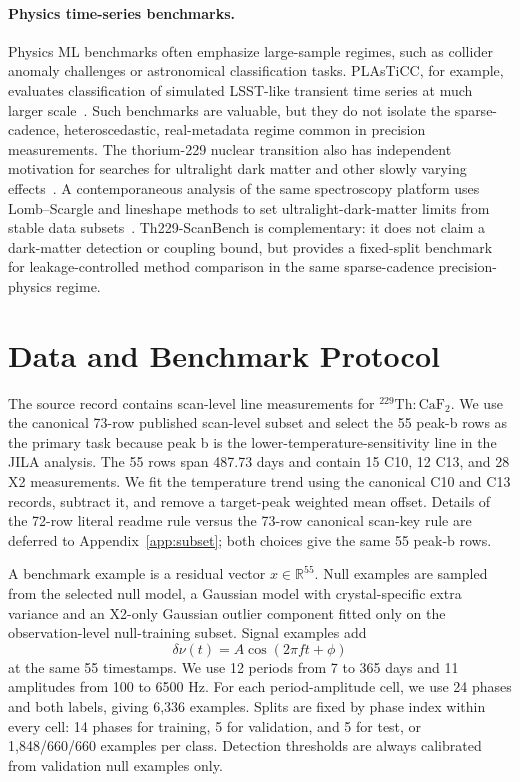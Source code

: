 \documentclass{article}
\newcommand{\thscan}{Th229-ScanBench}
\begin{document}
\paragraph{Physics time-series benchmarks.}
Physics ML benchmarks often emphasize large-sample regimes, such as collider anomaly challenges or astronomical classification tasks.  PLAsTiCC, for example, evaluates classification of simulated LSST-like transient time series at much larger scale~\citep{kessler2019plasticc}.  Such benchmarks are valuable, but they do not isolate the sparse-cadence, heteroscedastic, real-metadata regime common in precision measurements.  The thorium-229 nuclear transition also has independent motivation for searches for ultralight dark matter and other slowly varying effects~\citep{fuchs2025searching}.  A contemporaneous analysis of the same spectroscopy platform uses Lomb--Scargle and lineshape methods to set ultralight-dark-matter limits from stable data subsets~\citep{arakawa2026probing}.  \thscan{} is complementary: it does not claim a dark-matter detection or coupling bound, but provides a fixed-split benchmark for leakage-controlled method comparison in the same sparse-cadence precision-physics regime.

\section{Data and Benchmark Protocol}

The source record contains scan-level line measurements for \(^{229}\mathrm{Th}:\mathrm{CaF}_2\).  We use the canonical 73-row published scan-level subset and select the 55 peak-b rows as the primary task because peak b is the lower-temperature-sensitivity line in the JILA analysis.  The 55 rows span 487.73 days and contain 15 C10, 12 C13, and 28 X2 measurements.  We fit the temperature trend using the canonical C10 and C13 records, subtract it, and remove a target-peak weighted mean offset.  Details of the 72-row literal readme rule versus the 73-row canonical scan-key rule are deferred to Appendix~\ref{app:subset}; both choices give the same 55 peak-b rows.

A benchmark example is a residual vector \(x\in\mathbb{R}^{55}\).  Null examples are sampled from the selected null model, a Gaussian model with crystal-specific extra variance and an X2-only Gaussian outlier component fitted only on the observation-level null-training subset.  Signal examples add
\begin{equation}
  \delta\nu(t) = A\cos(2\pi f t + \phi)
\end{equation}
at the same 55 timestamps.  We use 12 periods from 7 to 365 days and 11 amplitudes from 100 to 6500 Hz.  For each period-amplitude cell, we use 24 phases and both labels, giving 6,336 examples.  Splits are fixed by phase index within every cell: 14 phases for training, 5 for validation, and 5 for test, or 1,848/660/660 examples per class.  Detection thresholds are always calibrated from validation null examples only.
\end{document}
